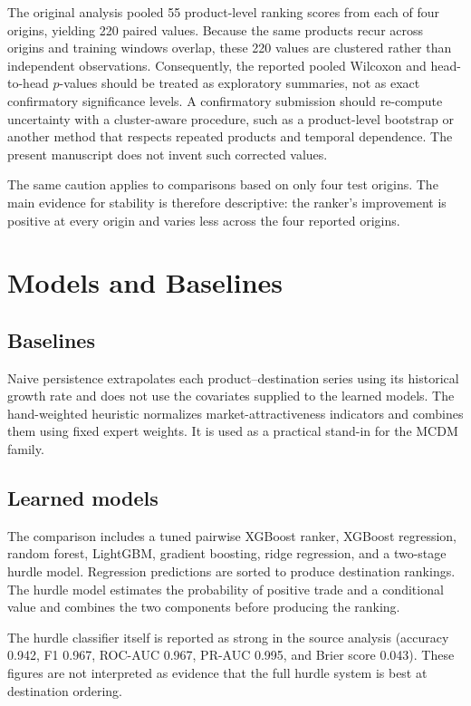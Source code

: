 \documentclass[conference]{IEEEtran}
\begin{document}
The original analysis pooled 55 product-level ranking scores from each of four origins, yielding 220 paired values. Because the same products recur across origins and training windows overlap, these 220 values are clustered rather than independent observations. Consequently, the reported pooled Wilcoxon and head-to-head $p$-values should be treated as exploratory summaries, not as exact confirmatory significance levels. A confirmatory submission should re-compute uncertainty with a cluster-aware procedure, such as a product-level bootstrap or another method that respects repeated products and temporal dependence. The present manuscript does not invent such corrected values.

The same caution applies to comparisons based on only four test origins. The main evidence for stability is therefore descriptive: the ranker's improvement is positive at every origin and varies less across the four reported origins.

\section{Models and Baselines}

\subsection{Baselines}

Naive persistence extrapolates each product--destination series using its historical growth rate and does not use the covariates supplied to the learned models. The hand-weighted heuristic normalizes market-attractiveness indicators and combines them using fixed expert weights. It is used as a practical stand-in for the MCDM family.

\subsection{Learned models}

The comparison includes a tuned pairwise XGBoost ranker, XGBoost regression, random forest, LightGBM, gradient boosting, ridge regression, and a two-stage hurdle model. Regression predictions are sorted to produce destination rankings. The hurdle model estimates the probability of positive trade and a conditional value and combines the two components before producing the ranking.

The hurdle classifier itself is reported as strong in the source analysis (accuracy 0.942, F1 0.967, ROC-AUC 0.967, PR-AUC 0.995, and Brier score 0.043). These figures are not interpreted as evidence that the full hurdle system is best at destination ordering.
\end{document}
